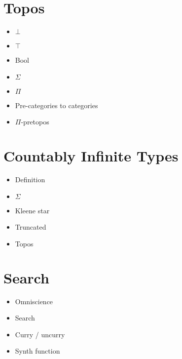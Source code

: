 \section{Topos}
\begin{itemize}
  \item \(\bot\)
  \item \(\top\)
  \item Bool
  \item \(\Sigma\)
  \item \(\Pi\)
  \item Pre-categories to categories
  \item \(\Pi\)-pretopos
\end{itemize}
\section{Countably Infinite Types}
\begin{itemize}
  \item Definition
  \item \(\Sigma\)
  \item Kleene star
  \item Truncated
  \item Topos
\end{itemize}
\section{Search}
\begin{itemize}
  \item Omniscience
  \item Search
  \item Curry / uncurry
  \item Synth function
\end{itemize}







